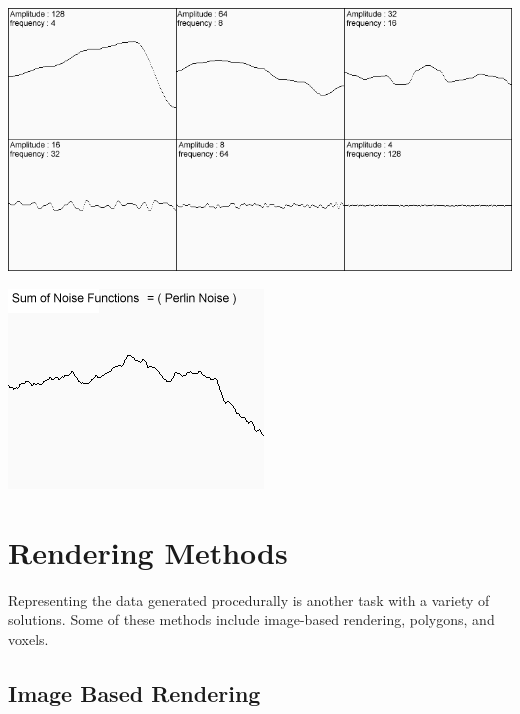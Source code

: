 \documentclass[10pt]{report}
\begin{document}
			\begin{minipage}{\textwidth}
				\centering
				\includegraphics[scale=.4]{octave01}
				\label{fig:oct1}
			\end{minipage}
			\begin{minipage}{\textwidth}
				\centering
				\includegraphics[scale=.75]{octave02}
				\label{fig:oct2}
			\end{minipage}
		
	\vspace{10pt}
	\let\clearpage\relax
	\chapter{Rendering Methods}
	
		Representing the data generated procedurally is another task with a variety of solutions. Some of these methods include image-based rendering, polygons, and voxels.
	
		\section{Image Based Rendering} \label{sec:imagebasedmethods}
		
\end{document}
